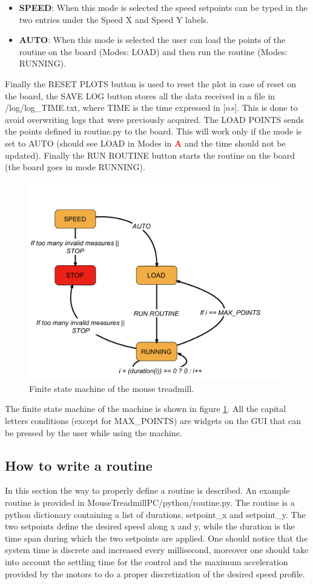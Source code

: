 \documentclass[12pt,a4paper, twoside]{article}
\begin{document}
\begin{itemize}
\begin{itemize}
		\item \textbf{SPEED}: When this mode is selected the speed setpoints can be typed in the two entries under the Speed X and Speed Y labels.
		\item \textbf{AUTO}: When this mode is selected the user can load the points of the routine on the board (Modes: LOAD) and then run the routine (Modes: RUNNING).
	\end{itemize} 
	Finally the RESET PLOTS button is used to reset the plot in case of reset on the board, the SAVE LOG button stores all the data received in a file in /log/log\_TIME.txt, where TIME is the time expressed in [$ns$]. This is done to avoid overwriting logs that were previously acquired. The LOAD POINTS sends the points defined in routine.py to the board. This will work only if the mode is set to AUTO (should see LOAD in Modes in  \textcolor{red}{\textbf{A}} and the time should not be updated). Finally the RUN ROUTINE button starts the routine on the board (the board goes in mode RUNNING).	
\end{itemize}  
\begin{figure}[H]
	\centering
	\includegraphics[width=0.7\linewidth]{fig/FSM.pdf}
	\caption{Finite state machine of the mouse treadmill.}\label{fig:FSM}
\end{figure}
The finite state machine of the machine is shown in figure \ref{fig:FSM}. All the capital letters conditions (except for MAX\_POINTS) are widgets on the GUI that can be pressed by the user while using the machine.\\

\subsection{How to write a routine}
In this section the way to properly define a routine is described. 
An example routine is provided in MouseTreadmillPC/python/routine.py. The routine is a python dictionary containing a list of durations, setpoint\_x and setpoint\_y. The two setpoints define the desired speed along x and y, while the duration is the time span during which the two setpoints are applied. One should notice that the system time is discrete and increased every millisecond, moreover one should take into account the settling time for the control and the maximum acceleration provided by the motors to do a proper discretization of the desired speed profile.\\
\end{document}
